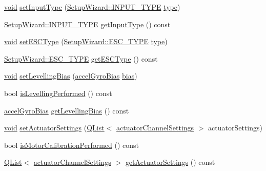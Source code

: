 \begin{DoxyCompactItemize}
\item 
\hyperlink{group___u_a_v_objects_plugin_ga444cf2ff3f0ecbe028adce838d373f5c}{void} \hyperlink{group___setup_gaad34b14bbd332f721c9bca49fc43bf33}{set\-Input\-Type} (\hyperlink{group___vehicle_configuration_source_gae10edd59d3a32fad8c531a1d2346115c}{Setup\-Wizard\-::\-I\-N\-P\-U\-T\-\_\-\-T\-Y\-P\-E} \hyperlink{glext_8h_a7d05960f4f1c1b11f3177dc963a45d86}{type})
\item 
\hyperlink{group___vehicle_configuration_source_gae10edd59d3a32fad8c531a1d2346115c}{Setup\-Wizard\-::\-I\-N\-P\-U\-T\-\_\-\-T\-Y\-P\-E} \hyperlink{group___setup_ga8457ec450095eb7b93fd74be5451cac6}{get\-Input\-Type} () const 
\item 
\hyperlink{group___u_a_v_objects_plugin_ga444cf2ff3f0ecbe028adce838d373f5c}{void} \hyperlink{group___setup_ga08e01090d6c906ff75ee8d840bbd9862}{set\-E\-S\-C\-Type} (\hyperlink{group___vehicle_configuration_source_ga734c812e17554d4f7ca67f1008abdd6c}{Setup\-Wizard\-::\-E\-S\-C\-\_\-\-T\-Y\-P\-E} \hyperlink{glext_8h_a7d05960f4f1c1b11f3177dc963a45d86}{type})
\item 
\hyperlink{group___vehicle_configuration_source_ga734c812e17554d4f7ca67f1008abdd6c}{Setup\-Wizard\-::\-E\-S\-C\-\_\-\-T\-Y\-P\-E} \hyperlink{group___setup_ga3922ac6f628847018f045d0c60f1ba6b}{get\-E\-S\-C\-Type} () const 
\item 
\hyperlink{group___u_a_v_objects_plugin_ga444cf2ff3f0ecbe028adce838d373f5c}{void} \hyperlink{group___setup_ga04cbfb7730776465a95c22950d048556}{set\-Levelling\-Bias} (\hyperlink{structaccel_gyro_bias}{accel\-Gyro\-Bias} \hyperlink{glext_8h_a39c3ffa18f420251c5d132dd8c1c6137}{bias})
\item 
bool \hyperlink{group___setup_ga71069ce8994f32f192e40aaa45b51a4a}{is\-Levelling\-Performed} () const 
\item 
\hyperlink{structaccel_gyro_bias}{accel\-Gyro\-Bias} \hyperlink{group___setup_ga2e280373fdc65c0cb8c5520855eadbef}{get\-Levelling\-Bias} () const 
\item 
\hyperlink{group___u_a_v_objects_plugin_ga444cf2ff3f0ecbe028adce838d373f5c}{void} \hyperlink{group___setup_gadf481b176ca83f64ec53b8479220abec}{set\-Actuator\-Settings} (\hyperlink{class_q_list}{Q\-List}$<$ \hyperlink{structactuator_channel_settings}{actuator\-Channel\-Settings} $>$ actuator\-Settings)
\item 
bool \hyperlink{group___setup_ga98d902dbc91dfbd4c88f9adbc6f57e89}{is\-Motor\-Calibration\-Performed} () const 
\item 
\hyperlink{class_q_list}{Q\-List}$<$ \hyperlink{structactuator_channel_settings}{actuator\-Channel\-Settings} $>$ \hyperlink{group___setup_ga47a0be6b075d0075a7ae935c7fe5deed}{get\-Actuator\-Settings} () const 

\end{DoxyCompactItemize}
